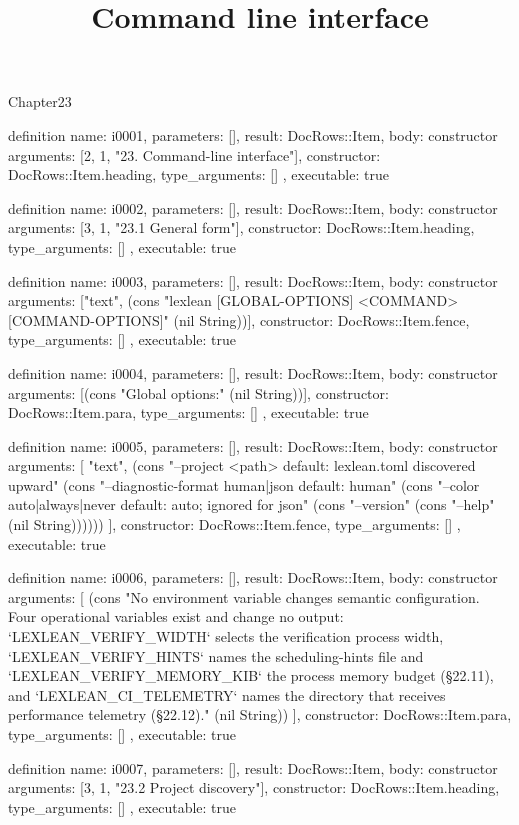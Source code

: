 \begin{lexlean}{Chapter23}
\title{Command line interface}
\begin{semanticmodule}
definition{
  name: i0001,
  parameters: [],
  result: DocRows::Item,
  body: constructor{
    arguments: [2, 1, "23. Command-line interface"],
    constructor: DocRows::Item.heading,
    type_arguments: []
  },
  executable: true
}

definition{
  name: i0002,
  parameters: [],
  result: DocRows::Item,
  body: constructor{
    arguments: [3, 1, "23.1 General form"],
    constructor: DocRows::Item.heading,
    type_arguments: []
  },
  executable: true
}

definition{
  name: i0003,
  parameters: [],
  result: DocRows::Item,
  body: constructor{
    arguments: ["text", (cons "lexlean [GLOBAL-OPTIONS] <COMMAND> [COMMAND-OPTIONS]" (nil String))],
    constructor: DocRows::Item.fence,
    type_arguments: []
  },
  executable: true
}

definition{
  name: i0004,
  parameters: [],
  result: DocRows::Item,
  body: constructor{
    arguments: [(cons "Global options:" (nil String))],
    constructor: DocRows::Item.para,
    type_arguments: []
  },
  executable: true
}

definition{
  name: i0005,
  parameters: [],
  result: DocRows::Item,
  body: constructor{
    arguments: [
      "text",
      (cons "--project <path>                  default: lexlean.toml discovered upward" (cons "--diagnostic-format human|json    default: human" (cons "--color auto|always|never         default: auto; ignored for json" (cons "--version" (cons "--help" (nil String))))))
    ],
    constructor: DocRows::Item.fence,
    type_arguments: []
  },
  executable: true
}

definition{
  name: i0006,
  parameters: [],
  result: DocRows::Item,
  body: constructor{
    arguments: [
      (cons "No environment variable changes semantic configuration. Four operational variables exist and change no output: `LEXLEAN_VERIFY_WIDTH` selects the verification process width, `LEXLEAN_VERIFY_HINTS` names the scheduling-hints file and `LEXLEAN_VERIFY_MEMORY_KIB` the process memory budget (§22.11), and `LEXLEAN_CI_TELEMETRY` names the directory that receives performance telemetry (§22.12)." (nil String))
    ],
    constructor: DocRows::Item.para,
    type_arguments: []
  },
  executable: true
}

definition{
  name: i0007,
  parameters: [],
  result: DocRows::Item,
  body: constructor{
    arguments: [3, 1, "23.2 Project discovery"],
    constructor: DocRows::Item.heading,
    type_arguments: []
  },
  executable: true
}


\end{semanticmodule}
\end{lexlean}
